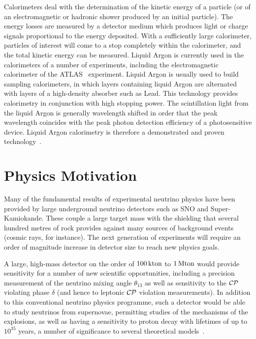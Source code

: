 Calorimeters deal with the determination of the kinetic energy of a particle (or of an electromagnetic or hadronic shower produced by an initial particle). The energy losses are measured by a detector medium which produces light or charge signals proportional to the energy deposited. With a sufficiently large calorimeter, particles of interest will come to a stop completely within the calorimeter, and the total kinetic energy can be measured. Liquid Argon is currently used in the calorimeters of a number of experiments, including the electromagnetic calorimeter of the ATLAS~\citep{ATLAS1999} experiment. Liquid Argon is usually used to build sampling calorimeters, in which layers containing liquid Argon are alternated with layers of a high-density absorber such as Lead. This technology provides calorimetry in conjunction with high stopping power. The scintillation light from the liquid Argon is generally wavelength shifted in order that the peak wavelength coincides with the peak photon detection efficiency of a photosensitive device. Liquid Argon calorimetry is therefore a demonstrated and proven technology~\citep{Aprile2006}.

\section{Physics Motivation}
Many of the fundamental results of experimental neutrino physics have been provided by large underground neutrino detectors such as SNO and Super-Kamiokande. These couple a large target mass with the shielding that several hundred metres of rock provides against many sources of background events (cosmic rays, for instance). The next generation of experiments will require an order of magnitude increase in detector size to reach new physics goals.

A large, high-mass detector on the order of $100\,\mathrm{kton}$ to $1\,\mathrm{Mton}$ would provide sensitivity for a number of new scientific opportunities, including a precision measurement of the neutrino mixing angle $\theta_{13}$ as well as sensitivity to the $\mathcal{C}\mathcal{P}$ violating phase $\delta$ (and hence to leptonic $\mathcal{C}\mathcal{P}$ violation measurements). In addition to this conventional neutrino physics programme, such a detector would be able to study neutrinos from supernovae, permitting studies of the mechanisms of the explosions, as well as having a sensitivity to proton decay with lifetimes of up to $10^{35}$ years, a number of significance to several theoretical models~\citep{Laguna2009}.

